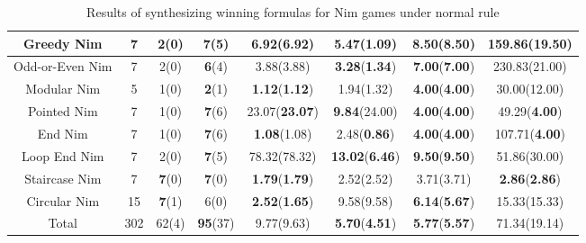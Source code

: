 \documentclass[review]{elsarticle}
\begin{document}
\begin{table}[h!]
{\begin{tabular}{|c|c|c|c|c|c|c|c|}
		Greedy Nim & 7 & 2(0) & \textbf{7}(5) & 6.92(6.92) & \textbf{5.47}(\textbf{1.09}) & \textbf{8.50}(\textbf{8.50}) & 159.86(19.50) \\ \hline
		Odd-or-Even Nim & 7 & 2(0) & \textbf{6}(4) & 3.88(3.88) & \textbf{3.28}(\textbf{1.34}) & \textbf{7.00}(\textbf{7.00}) & 230.83(21.00) \\ \hline
		Modular Nim & 5 & 1(0) & \textbf{2}(1) & \textbf{1.12}(\textbf{1.12}) & 1.94(1.32) & \textbf{4.00}(\textbf{4.00}) & 30.00(12.00) \\ \hline
		Pointed Nim & 7 & 1(0) & \textbf{7}(6) & 23.07(\textbf{23.07}) & \textbf{9.84}(24.00) & \textbf{4.00}(\textbf{4.00}) & 49.29(\textbf{4.00}) \\ \hline
		End Nim & 7 & 1(0) & \textbf{7}(6) & \textbf{1.08}(1.08) & 2.48(\textbf{0.86}) & \textbf{4.00}(\textbf{4.00}) & 107.71(\textbf{4.00}) \\ \hline
		Loop End Nim & 7 & 2(0) & \textbf{7}(5) & 78.32(78.32) & \textbf{13.02}(\textbf{6.46}) & \textbf{9.50}(\textbf{9.50}) & 51.86(30.00) \\ \hline
		Staircase Nim & 7 & \textbf{7}(0) & \textbf{7}(0) & \textbf{1.79}(\textbf{1.79}) & 2.52(2.52) & 3.71(3.71) & \textbf{2.86}(\textbf{2.86}) \\ \hline
		Circular Nim & 15 & \textbf{7}(1) & 6(0) & \textbf{2.52}(\textbf{1.65}) & 9.58(9.58) & \textbf{6.14}(\textbf{5.67}) & 15.33(15.33) \\ \hline
		Total & 302 & 62(4) & \textbf{95}(37) & 9.77(9.63) & \textbf{5.70}(\textbf{4.51}) & \textbf{5.77}(\textbf{5.57}) & 71.34(19.14) \\ \hline
	\end{tabular}%
	}
	\caption{Results of synthesizing winning formulas for Nim games under normal rule}
	\label{tab:normal-nim-winFormulas}
\end{table}
\end{document}
